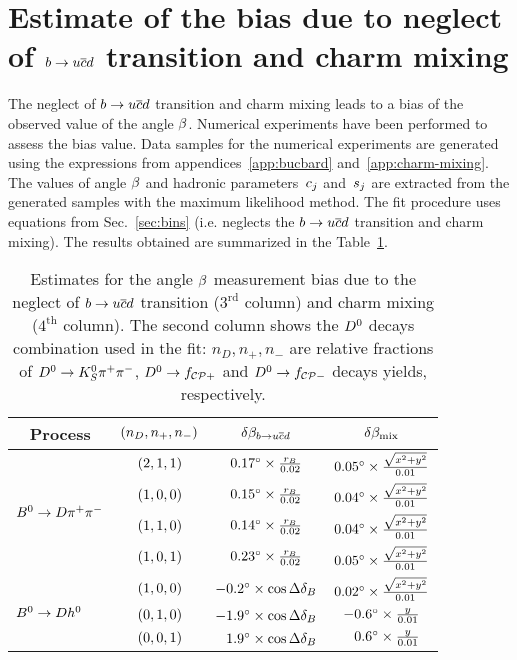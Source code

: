 \documentclass[a4paper,11pt]{article}
\begin{document}
\section{\boldmath Estimate of the bias due to neglect of 
\texorpdfstring{$b\to u\overline{c}d$}{b -> c ubar d} transition and charm mixing}
\label{app:systematics-evaluation}
The neglect of $b\to u\overline{c}d$ transition and charm mixing leads to a
bias of the observed value of the angle $\beta$.  Numerical experiments 
have been performed to assess the bias value.  Data samples for the numerical 
experiments are generated using the expressions from appendices~\ref{app:bucbard} 
and~\ref{app:charm-mixing}.  The values of angle $\beta$ and hadronic 
parameters~$c_j$ and~$s_j$ are extracted from the generated 
samples with the maximum likelihood method.  The fit procedure uses equations from 
Sec.~\ref{sec:bins} (i.e. neglects the $b\to u\overline{c}d$ transition and charm 
mixing). The results obtained are summarized in the Table~\ref{tab:beta_bias}.

\begin{table}[t]
 \caption{Estimates for the angle $\beta$ measurement bias due
 to the neglect of $b\to u\overline{c}d$ transition ($3^{\mathrm{rd}}$ column) and charm mixing 
 ($4^{\mathrm{th}}$ column).  The second column shows the $D^0$ decays combination 
 used in the fit: $n_D, n_+, n_-$ are relative fractions of 
 $D^0 \to K_S^0\pi^+\pi^-$, $D^0\to f_{\mathcal{CP}+}$ and $D^0\to f_{\mathcal{CP}-}$ decays yields, respectively.}
  \label{tab:beta_bias}
  \centering
 \begin{tabular}{lccc}
  \hline\hline
   \multicolumn{1}{c}{Process} &
   \multicolumn{1}{c}{$\left( n_D, n_+, n_-\right)$} &
   \multicolumn{1}{c}{$\delta\beta_{b\to u\overline{c}d}$} &
   \multicolumn{1}{c}{$\delta\beta_{\mathrm{mix}}$}
   \\ \hline
   \multirow{4}{*}{$B^0\to D\pi^+\pi^-$} 
   & $\left( 2, 1, 1 \right)$ & $0.17{}^{\circ}\times\frac{r_{B}}{0.02}$ & $0.05{}^{\circ}\times \frac{\sqrt{x^2+y^2}}{0.01}$ \\
   & $\left( 1, 0, 0 \right)$ & $0.15{}^{\circ}\times\frac{r_{B}}{0.02}$ & $0.04{}^{\circ}\times \frac{\sqrt{x^2+y^2}}{0.01}$ \\
   & $\left( 1, 1, 0 \right)$ & $0.14{}^{\circ}\times\frac{r_{B}}{0.02}$ & $0.04{}^{\circ}\times \frac{\sqrt{x^2+y^2}}{0.01}$ \\
   & $\left( 1, 0, 1 \right)$ & $0.23{}^{\circ}\times\frac{r_{B}}{0.02}$ & $0.05{}^{\circ}\times \frac{\sqrt{x^2+y^2}}{0.01}$ \\
   \hline
   \multirow{3}{*}{$B^0\to D h^0$}   
   & $\left( 1, 0, 0 \right)$ & $-0.2{}^{\circ}\times\cos{\Delta\delta_B}$ & $0.02{}^{\circ}\times \frac{\sqrt{x^2+y^2}}{0.01}$ \\
   & $\left( 0, 1, 0 \right)$ & $-1.9{}^{\circ}\times\cos{\Delta\delta_B}$ & $-0.6{}^{\circ}\times \frac{y}{0.01}$ \\
   & $\left( 0, 0, 1 \right)$ & $\phantom{-}1.9{}^{\circ}\times\cos{\Delta\delta_B}$ & $\phantom{-}0.6{}^{\circ}\times \frac{y}{0.01}$ \\
  \hline\hline
 \end{tabular}
\end{table}
\end{document}
